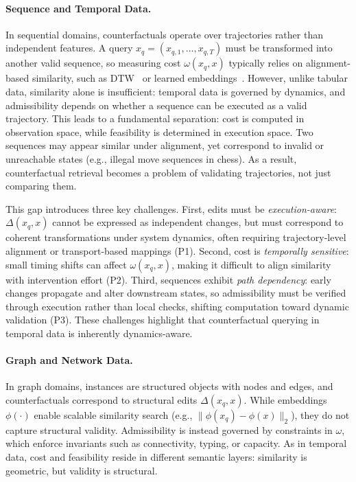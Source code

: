 \paragraph{Sequence and Temporal Data.}
In sequential domains, counterfactuals operate over trajectories rather than independent features. A query $x_q=(x_{q,1},\dots,x_{q,T})$ must be transformed into another valid sequence, so measuring cost $\omega(x_q,x)$ typically relies on alignment-based similarity, such as DTW~\cite{senin2008dynamic} or learned embeddings~\cite{nalmpantis2019signal2vec}. However, unlike tabular data, similarity alone is insufficient: temporal data is governed by dynamics, and admissibility depends on whether a sequence can be executed as a valid trajectory. This leads to a fundamental separation: cost is computed in observation space, while feasibility is determined in execution space. Two sequences may appear similar under alignment, yet correspond to invalid or unreachable states (e.g., illegal move sequences in chess). As a result, counterfactual retrieval becomes a problem of validating trajectories, not just comparing them.

This gap introduces three key challenges. First, edits must be \emph{execution-aware}: $\Delta(x_q,x)$ cannot be expressed as independent changes, but must correspond to coherent transformations under system dynamics, often requiring trajectory-level alignment or transport-based mappings (P1). Second, cost is \emph{temporally sensitive}: small timing shifts can affect $\omega(x_q,x)$, making it difficult to align similarity with intervention effort (P2). Third, sequences exhibit \emph{path dependency}: early changes propagate and alter downstream states, so admissibility must be verified through execution rather than local checks, shifting computation toward dynamic validation (P3). These challenges highlight that counterfactual querying in temporal data is inherently dynamics-aware.

\paragraph{Graph and Network Data.}

In graph domains, instances are structured objects with nodes and edges, and counterfactuals correspond to structural edits $\Delta(x_q,x)$. While embeddings $\phi(\cdot)$ enable scalable similarity search (e.g., $\|\phi(x_q)-\phi(x)\|_2$), they do not capture structural validity. Admissibility is instead governed by constraints in $\omega$, which enforce invariants such as connectivity, typing, or capacity. As in temporal data, cost and feasibility reside in different semantic layers: similarity is geometric, but validity is structural.

